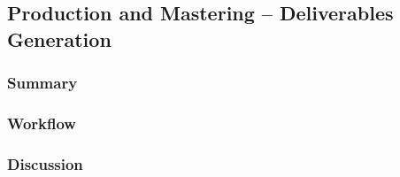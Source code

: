 \subsection{Production and Mastering -- Deliverables Generation} \label{subsec:tv-mastering}

	\subsubsection{Summary}
	
	\lipsum[1] %
	
	\subsubsection{Workflow}
	
	\lipsum[1] %
	
	\subsubsection{Discussion}
	
	\lipsum[1] %